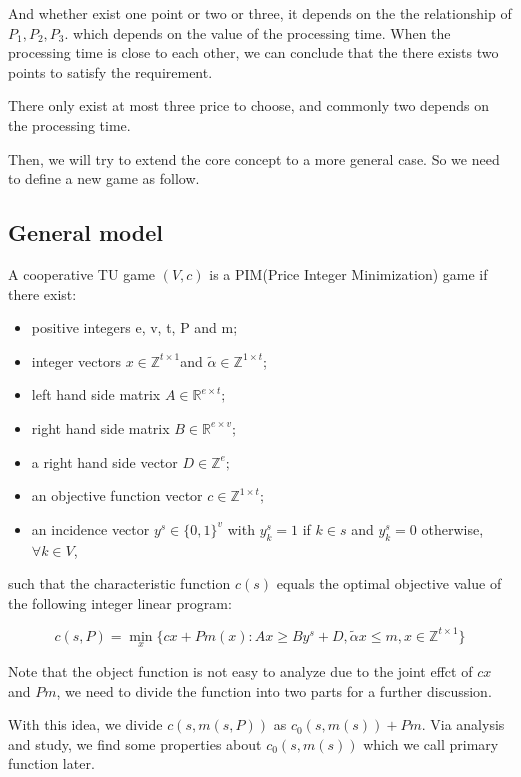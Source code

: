 And whether exist one point or two or three, it depends on the the relationship of $P_1,P_2, P_3$.
which depends on the value of the processing time. When the processing time is close to each other, we can conclude that the there exists two points to satisfy the requirement.

There only exist at most three price to choose, and commonly two depends on the processing time.


Then, we will try to extend the core concept to a more general case. So we need to define a new game as follow.

\subsection*{General model}

A cooperative TU game $(V,c)$ is a PIM(Price Integer Minimization) game if there exist:

\begin{itemize}
	\item positive integers e, v, t, P and m;
	\item integer vectors $ x \in \mathbb{Z}^{t \times 1} $and $ \tilde{\alpha} \in \mathbb{Z}^{1 \times t} $;
	\item left hand side matrix  $A \in \mathbb{R} ^{e \times t};$
	\item right hand side matrix $B \in \mathbb{R} ^ {e \times v};$
	\item a right hand side vector $D \in \mathbb{Z} ^ {e};$
	\item an objective function vector
	$c \in \mathbb{Z}^{1 \times t};$
	\item an incidence vector $y^s \in \{0,1\}^v$ with $y^s_k = 1$ if $k \in s$ and $y^s_k = 0 $ otherwise, $\forall k \in V$,

\end{itemize}

such that the characteristic function $c(s)$ equals the optimal objective value of the following integer linear program:

\[
c(s,P)= \mathop{\min}_{x} \{ cx+Pm(x): Ax \geq By^s+D, \tilde{\alpha}x \leq m, x \in \mathbb{Z}^{t \times 1} \}
\]

Note that the object function is not easy to analyze due to the joint effct of $cx$ and $Pm$, we need to divide the function into two parts for a further discussion.

With this idea, we divide $c(s,m(s,P))$ as $c_0(s,m(s))+Pm $. Via analysis and study, we find some properties about $c_0(s,m(s)) $ which we call primary function later.

